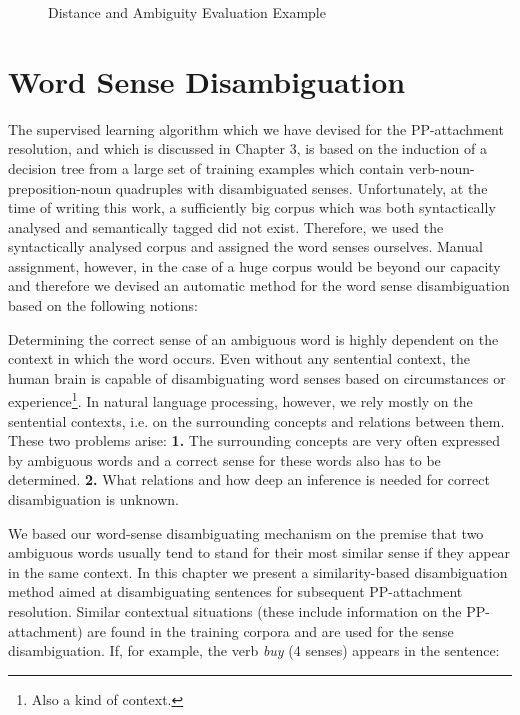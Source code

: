 \begin{figure}[t]
  \leavevmode
  \begin{center}
	
    \caption{Distance and Ambiguity Evaluation Example}
    \label{fig:1}
  \end{center}
\end{figure}


\section{Word Sense Disambiguation}

The supervised learning algorithm which we have devised for the PP-attachment resolution, and which is discussed in Chapter 3, is based on the induction of a decision tree from a large set of training examples which contain verb-noun-preposition-noun quadruples with disambiguated senses. Unfortunately, at the time of writing this work, a sufficiently big corpus which was both syntactically analysed and semantically tagged did not exist. Therefore, we used the syntactically analysed corpus \cite{MA93} and assigned the word senses ourselves. Manual assignment, however, in the case of a huge corpus would be beyond our capacity and therefore we devised an automatic method for the word sense disambiguation based on the following notions:

Determining the correct sense of an ambiguous word is highly dependent on the context in which the word occurs. Even without any sentential context, the human brain is capable of disambiguating word senses based on circumstances or experience\footnote{Also a kind of context.}. In natural language processing, however, we rely mostly on the sentential contexts, i.e. on the surrounding concepts and relations between them. These two problems arise: {\bf 1.} The surrounding concepts are very often expressed by ambiguous words and a correct sense for these words also has to be determined. {\bf 2.} What relations and how deep an inference is needed for correct disambiguation is unknown.

We based our word-sense disambiguating mechanism on the premise that two ambiguous words usually tend to stand for their most similar sense if they appear in the same context. In this chapter we present a similarity-based disambiguation method aimed at disambiguating sentences for subsequent PP-attachment resolution. Similar contextual situations (these include information on the PP-attachment) are found in the training corpora and are used for the sense disambiguation. If, for example, the verb {\it buy} (4 senses) appears in the sentence:

